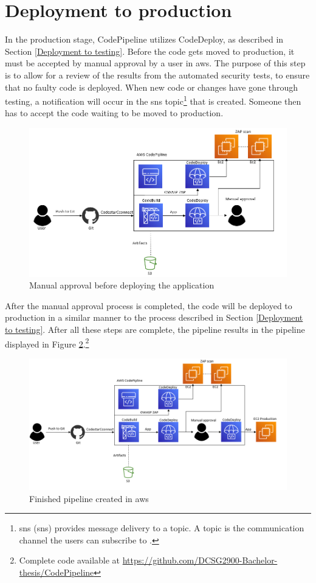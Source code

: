 \section{Deployment to production}
In the production stage, CodePipeline utilizes CodeDeploy, as described in Section \ref{Deployment to testing}. Before the code gets moved to production, it must be accepted by manual approval by a user in \acrshort{aws}. The purpose of this step is to allow for a review of the results from the automated security tests, to ensure that no faulty code is deployed. When new code or changes have gone through testing, a notification will occur in the \acrshort{sns} topic\footnote{\acrlong{sns} (\acrshort{sns}) provides message delivery to a topic. A topic is the communication channel the users can subscribe to \cite{SNStopic}.} that is created. Someone then has to accept the code waiting to be moved to production.

\vspace{2mm}
\begin{figure}[H]
    \centering
    \includegraphics[width=0.8\columnwidth]{Images/aws-piplin-6.png}
    \caption{Manual approval before deploying the application}
    \label{fig: Manual approval before deploying the application}
\end{figure}

After the manual approval process is completed, the code will be deployed to production in a similar manner to the process described in Section \ref{Deployment to testing}. After all these steps are complete, the pipeline results in the pipeline displayed in Figure \ref{fig: Finished pipeline created in AWS}.\footnote{Complete code available at \url{https://github.com/DCSG2900-Bachelor-thesis/CodePipeline}}

\vspace{2mm}
\begin{figure}[H]
    \centering
    \includegraphics[width=0.8\columnwidth]{Images/aws-piplin-7.png}
    \caption{Finished pipeline created in \acrshort{aws}}
    \label{fig: Finished pipeline created in AWS}
\end{figure}